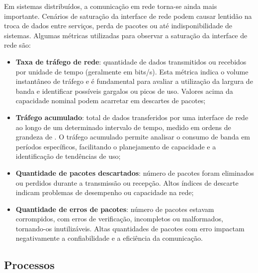 {\color{red}

Em sistemas distribuídos, a comunicação em rede torna-se ainda mais importante. Cenários de saturação da interface de rede podem causar lentidão na troca de dados entre serviços, perda de pacotes ou até indisponibilidade de sistemas. Algumas métricas utilizadas para observar a saturação da interface de rede são:

\begin{itemize}
    \item \textbf{Taxa de tráfego de rede}: quantidade de dados transmitidos ou recebidos por unidade de tempo (geralmente em bits/s). Esta métrica indica o volume instantâneo de tráfego e é fundamental para avaliar a utilização da largura de banda e identificar possíveis gargalos ou picos de uso. Valores acima da capacidade nominal podem acarretar em descartes de pacotes;
    \item \textbf{Tráfego acumulado}: total de dados transferidos por uma interface de rede ao longo de um determinado intervalo de tempo, medido em ordens de grandeza de . O tráfego acumulado permite analisar o consumo de banda em períodos específicos, facilitando o planejamento de capacidade e a identificação de tendências de uso;
    \item \textbf{Quantidade de pacotes descartados}: número de pacotes foram eliminados ou perdidos durante a transmissão ou recepção. Altos índices de descarte indicam problemas de desempenho ou capacidade na rede;
    \item \textbf{Quantidade de erros de pacotes}: número de pacotes estavam corrompidos, com erros de verificação, incompletos ou malformados, tornando-os inutilizáveis. Altas quantidades de pacotes com erro impactam negativamente a confiabilidade e a eficiência da comunicação.
\end{itemize}

}

\subsection{Processos}
\label{subsection:Processos}


